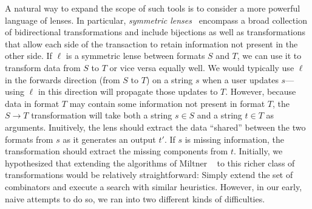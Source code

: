 \documentclass[acmsmall,screen,anonymous]{acmart}
\begin{document}
A natural way to expand the scope of such tools is to consider a more
powerful language of lenses.  In particular, \emph{symmetric
lenses}~\cite{symmetric-lenses} encompass a broad collection of bidirectional
transformations and include bijections as well as transformations that
allow each side of the transaction to retain information not present
in the other side.  If $\ell$ is a symmetric lense between formats $S$ and $T$, we can
use it to transform data from $S$ to $T$ or vice versa equally well.  We would typically
use $\ell$ in the forwards direction (from $S$ to $T$) on a string $s$ when a user updates
$s$---using $\ell$ in this direction will propagate those updates to $T$.
However, because data in format $T$ may contain some information not present in format $T$,
the $S \rightarrow T$ transformation will take
both a string $s \in S$ and a string $t \in T$ as arguments.
Inuitively, the lens should extract the data ``shared'' between the two formats from $s$
as it generates an output $t'$.  If $s$ is missing information, the transformation should
extract the missing components from $t$.
Initially, we hypothesized that extending the algorithms
of Miltner \ETAL~\cite{miltner+:bijective-synthesis} to this richer class of
transformations would be relatively straightforward:  Simply extend the set
of combinators and execute a search with similar heuristics.  However, in our early,
naive attempts to do so, we ran
into two different kinds of difficulties. 
\end{document}
